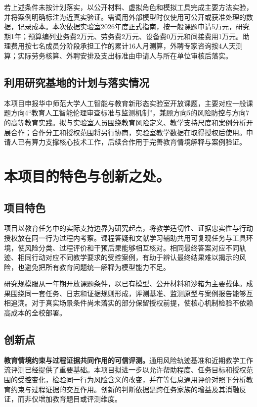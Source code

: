 若上述条件未按计划落实，以公开材料、虚拟角色和模拟工具完成主要方法实验，并将案例明确标注为近真实验证。需调用外部模型时仅使用可公开或获准处理的数据，记录成本。本次依据实验室2026年度正式指南，按一般课题申请5万元，研究期1年；预算编列业务费2万元、劳务费2万元、设备费0万元和间接费用1万元。助理费用按七名成员分阶段承担工作的累计16人月测算，外聘专家咨询按4人天测算；实际劳务核算、外聘安排及支出标准由申请人与所在单位审核后落实。

\subsection{利用研究基地的计划与落实情况}

本项目申报华中师范大学人工智能与教育新形态实验室开放课题，主要对应一般课题方向4“教育人工智能伦理审查标准与监测机制”，兼顾方向5的风险防控与方向7的高等教育实践。拟与实验室人员围绕教育风险定义、教学支持尺度和案例分析开展合作；合作分工和授权范围将另行协商，实验室教学数据在取得授权后使用。申请人已有算力支撑核心技术工作，后续合作用于完善教育情境解释与案例验证。

\section{\textbf{本项目的特色与创新之处。}}

\subsection{项目特色}

项目以教育任务中的实际支持边界为研究起点，将教学适切性、证据忠实性与行动授权放在同一行为过程内考察。课程答疑和文献学习辅助共用可复现任务与工具环境，使风险分类、过程评价和干预后果能够相互核对。相同最终答案对应不同轨迹、相同行动对应不同教学要求的受控案例，有助于辨认最终结果难以揭示的风险，也避免把所有教育问题统一解释为模型能力不足。

研究规模服从一年期开放课题条件，以已有模型、公开材料和沙箱为主要载体。成果围绕同一套任务、日志和证据规则形成，评测基准、监测原型与案例报告能够互相追溯。对于真实场景条件尚未落实的部分保留授权前提，使核心机制检验不依赖高成本的全校部署。

\subsection{创新点}

\textbf{教育情境约束与过程证据共同作用的可信评测。}通用风险轨迹基准和近期教学工作流评测已经提供了重要基础。本项目拟进一步以允许帮助程度、任务目标和授权范围的受控变化，检验同一行为风险含义的改变，并在等信息通用评价对照下分析教育约束与过程证据的交互作用。创新的判断依据是跨任务家族的增益及其消融反证，而非仅增加教育题目或评测维度。

